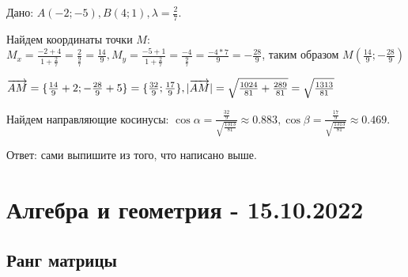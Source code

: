 \documentclass{article}
\def\vec{\ensuremath\overrightarrow}
\begin{document}
\begin{flushleft}

Дано: $A(-2; -5), B(4; 1), \lambda = \frac{2}{7}$.

Найдем координаты точки $M$: $M_x = \frac{-2 + 4}{1 + \frac{2}{7}} = \frac{2}{\frac{9}{7}} = \frac{14}{9}, M_y = \frac{-5 + 1}{1 + \frac{2}{7}} = \frac{-4}{\frac{9}{7}} = \frac{-4 * 7}{9} = -\frac{28}{9}$, таким образом $M(\frac{14}{9}; -\frac{28}{9})$

$\vec{AM} = \{\frac{14}{9} + 2; -\frac{28}{9} + 5\} = \{\frac{32}{9}; \frac{17}{9}\}, |\vec{AM}| = \sqrt{\frac{1024}{81} + \frac{289}{81}} = \sqrt{\frac{1313}{81}}$ 

Найдем направляющие косинусы: $\cos \alpha = \frac{\frac{32}{9}}{\sqrt{\frac{1313}{81}}} \approx 0.883, \cos \beta = \frac{\frac{17}{9}}{\sqrt{\frac{1313}{81}}} \approx 0.469$.

Ответ: сами выпишите из того, что написано выше.

\end{flushleft}

\pagebreak
\section{Алгебра и геометрия - 15.10.2022}

\subsection{Ранг матрицы}
\end{document}
